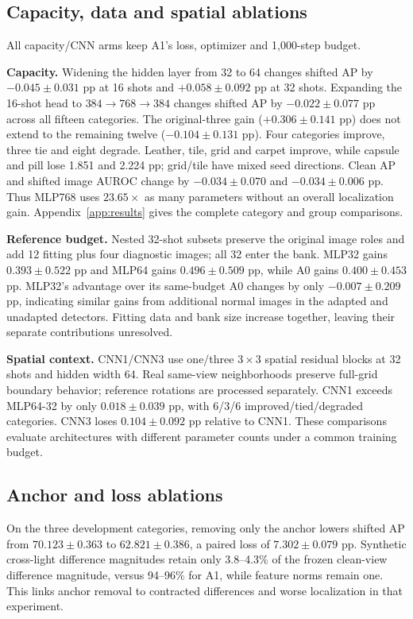 \subsection{Capacity, data and spatial ablations}
All capacity/CNN arms keep A1's loss, optimizer and 1,000-step budget.

\textbf{Capacity.} Widening the hidden layer from 32 to 64 changes shifted AP by $-0.045\pm0.031$ pp at 16 shots and $+0.058\pm0.092$ pp at 32 shots. Expanding the 16-shot head to $384\rightarrow768\rightarrow384$ changes shifted AP by $-0.022\pm0.077$ pp across all fifteen categories. The original-three gain ($+0.306\pm0.141$ pp) does not extend to the remaining twelve ($-0.104\pm0.131$ pp). Four categories improve, three tie and eight degrade. Leather, tile, grid and carpet improve, while capsule and pill lose 1.851 and 2.224 pp; grid/tile have mixed seed directions. Clean AP and shifted image AUROC change by $-0.034\pm0.070$ and $-0.034\pm0.006$ pp. Thus MLP768 uses $23.65\times$ as many parameters without an overall localization gain. Appendix~\ref{app:results} gives the complete category and group comparisons.

\textbf{Reference budget.} Nested 32-shot subsets preserve the original image roles and add 12 fitting plus four diagnostic images; all 32 enter the bank. MLP32 gains $0.393\pm0.522$ pp and MLP64 gains $0.496\pm0.509$ pp, while A0 gains $0.400\pm0.453$ pp. MLP32's advantage over its same-budget A0 changes by only $-0.007\pm0.209$ pp, indicating similar gains from additional normal images in the adapted and unadapted detectors. Fitting data and bank size increase together, leaving their separate contributions unresolved.

\textbf{Spatial context.} CNN1/CNN3 use one/three $3\times3$ spatial residual blocks at 32 shots and hidden width 64. Real same-view neighborhoods preserve full-grid boundary behavior; reference rotations are processed separately. CNN1 exceeds MLP64-32 by only $0.018\pm0.039$ pp, with 6/3/6 improved/tied/degraded categories. CNN3 loses $0.104\pm0.092$ pp relative to CNN1. These comparisons evaluate architectures with different parameter counts under a common training budget.

\subsection{Anchor and loss ablations}
On the three development categories, removing only the anchor lowers shifted AP from $70.123\pm0.363$ to $62.821\pm0.386$, a paired loss of $7.302\pm0.079$ pp. Synthetic cross-light difference magnitudes retain only 3.8--4.3\% of the frozen clean-view difference magnitude, versus 94--96\% for A1, while feature norms remain one. This links anchor removal to contracted differences and worse localization in that experiment.

